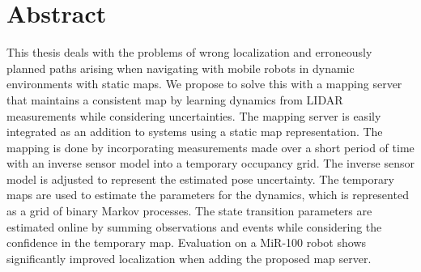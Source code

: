 \chapter*{Abstract}
This thesis deals with the problems of wrong localization and erroneously planned paths arising when navigating with mobile robots in dynamic environments with static maps.
We propose to solve this with a mapping server that maintains a consistent map by learning  dynamics from LIDAR measurements while considering uncertainties.
The mapping server is easily integrated as an addition to systems using a static map representation.
The mapping is done by incorporating measurements made over a short period of time with an inverse sensor model into a temporary occupancy grid.
The inverse sensor model is adjusted to represent the estimated pose uncertainty.
The temporary maps are used to estimate the parameters for the dynamics, which is represented as a grid of binary Markov processes.
The state transition parameters are estimated online by summing observations and events while considering the confidence in the temporary map.
Evaluation on a MiR-100 robot shows significantly improved localization when adding the proposed map server.